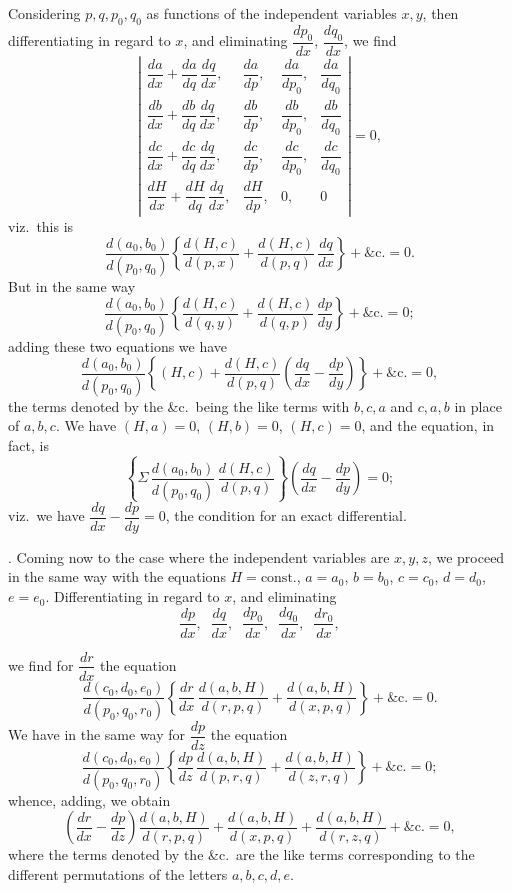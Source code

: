 \documentclass[11pt,a4paper]{article}
\begin{document}
Considering $p, q, p_{0}, q_{0}$ as functions of the independent variables $x, y$, then differentiating in regard to $x$, and eliminating $\dfrac{dp_{0}}{dx}$, $\dfrac{dq_{0}}{dx}$, we find
\[
\left|
\begin{array}{cccc}
\dfrac{da}{dx} + \dfrac{da}{dq}\,\dfrac{dq}{dx}, & \dfrac{da}{dp}, & \dfrac{da}{dp_{0}}, & \dfrac{da}{dq_{0}} \\[6pt]
\dfrac{db}{dx} + \dfrac{db}{dq}\,\dfrac{dq}{dx}, & \dfrac{db}{dp}, & \dfrac{db}{dp_{0}}, & \dfrac{db}{dq_{0}} \\[6pt]
\dfrac{dc}{dx} + \dfrac{dc}{dq}\,\dfrac{dq}{dx}, & \dfrac{dc}{dp}, & \dfrac{dc}{dp_{0}}, & \dfrac{dc}{dq_{0}} \\[6pt]
\dfrac{dH}{dx} + \dfrac{dH}{dq}\,\dfrac{dq}{dx}, & \dfrac{dH}{dp}, & 0, & 0
\end{array}
\right| = 0,
\]
viz.\ this is
\[
\frac{d(a_{0}, b_{0})}{d(p_{0}, q_{0})}\!\left\{ \frac{d(H, c)}{d(p, x)} + \frac{d(H, c)}{d(p, q)}\,\frac{dq}{dx} \right\} + \&\text{c.} = 0.
\]
But in the same way
\[
\frac{d(a_{0}, b_{0})}{d(p_{0}, q_{0})}\!\left\{ \frac{d(H, c)}{d(q, y)} + \frac{d(H, c)}{d(q, p)}\,\frac{dp}{dy} \right\} + \&\text{c.} = 0;
\]
adding these two equations we have
\[
\frac{d(a_{0}, b_{0})}{d(p_{0}, q_{0})}\!\left\{ (H, c) + \frac{d(H, c)}{d(p, q)}\!\left( \frac{dq}{dx} - \frac{dp}{dy} \right) \right\} + \&\text{c.} = 0,
\]
the terms denoted by the \&c.\ being the like terms with $b, c, a$ and $c, a, b$ in place of $a, b, c$. We have $(H, a) = 0$, $(H, b) = 0$, $(H, c) = 0$, and the equation, in fact, is
\[
\left\{ \Sigma\,\frac{d(a_{0}, b_{0})}{d(p_{0}, q_{0})}\,\frac{d(H, c)}{d(p, q)} \right\}\!\left( \frac{dq}{dx} - \frac{dp}{dy} \right) = 0;
\]
viz.\ we have $\dfrac{dq}{dx} - \dfrac{dp}{dy} = 0$, the condition for an exact differential.

\medskip

. Coming now to the case where the independent variables are $x, y, z$, we proceed in the same way with the equations $H = \text{const.}$, $a = a_{0}$, $b = b_{0}$, $c = c_{0}$, $d = d_{0}$, $e = e_{0}$. Differentiating in regard to $x$, and eliminating
\[
\frac{dp}{dx}, \;\; \frac{dq}{dx}, \;\; \frac{dp_{0}}{dx}, \;\; \frac{dq_{0}}{dx}, \;\; \frac{dr_{0}}{dx},
\]

\newpage


we find for $\dfrac{dr}{dx}$ the equation
\[
\frac{d(c_{0}, d_{0}, e_{0})}{d(p_{0}, q_{0}, r_{0})}\!\left\{ \frac{dr}{dx}\,\frac{d(a, b, H)}{d(r, p, q)} + \frac{d(a, b, H)}{d(x, p, q)} \right\} + \&\text{c.} = 0.
\]
We have in the same way for $\dfrac{dp}{dz}$ the equation
\[
\frac{d(c_{0}, d_{0}, e_{0})}{d(p_{0}, q_{0}, r_{0})}\!\left\{ \frac{dp}{dz}\,\frac{d(a, b, H)}{d(p, r, q)} + \frac{d(a, b, H)}{d(z, r, q)} \right\} + \&\text{c.} = 0;
\]
whence, adding, we obtain
\[
\!\left( \frac{dr}{dx} - \frac{dp}{dz} \right)\!\frac{d(a, b, H)}{d(r, p, q)} + \frac{d(a, b, H)}{d(x, p, q)} + \frac{d(a, b, H)}{d(r, z, q)} + \&\text{c.} = 0,
\]
where the terms denoted by the \&c.\ are the like terms corresponding to the different permutations of the letters $a, b, c, d, e$.
\end{document}

